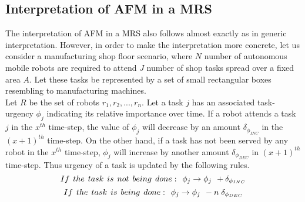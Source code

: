 \subsection{Interpretation of AFM in a MRS}
\label{afm:mrs-interpretation}
The interpretation of AFM in a MRS also follows almost exactly as in generic interpretation. However, in order to make the interpretation more concrete, let us consider a manufacturing shop floor scenario, where $N$ number of autonomous mobile robots are required to attend $J$ number of shop tasks spread over a fixed area $A$. Let these tasks be represented by a set of small rectangular boxes resembling to manufacturing machines.\\
Let $R$ be the set of robots ${r_1, r_2,...,r_n}$. Let a task $j$ has an associated task-urgency $\phi_j$ indicating its relative importance over time.
If a robot attends a task $j$ in the $x^{th}$ time-step, the value of $\phi_j$ will decrease by an amount $\delta_{\phi_{INC}}$ in the $(x+1)^{th}$ time-step.
On the other hand, if a task has not been served by any robot in the $x^{th}$ time-step, $\phi_j$ will increase by another amount  $\delta_{\phi_{DEC}}$  in $(x+1)^{th}$ time-step. Thus
urgency of a task is updated by the following rules.
\begin{equation}
 If\hspace*{0.15cm}the\hspace*{0.15cm} task\hspace*{0.15cm}is\hspace*{0.15cm}not\hspace*{0.15cm}being\hspace*{0.15cm} done:\hspace*{0.15cm}  \phi_j \rightarrow   \phi_j \hspace*{0.15cm} + \delta_{\phi_{INC}}
\label{eqn:delta-phi1}
\end{equation}
\begin{equation}
 If\hspace*{0.15cm}the \hspace*{0.15cm}task\hspace*{0.15cm}is\hspace*{0.15cm}being\hspace*{0.15cm}done:\hspace*{0.15cm}  \phi_j \rightarrow   \phi_j \hspace*{0.15cm} - n\hspace*{0.10cm}\delta_{\phi_{DEC}}
\label{eqn:delta-phi2}
\end{equation}
